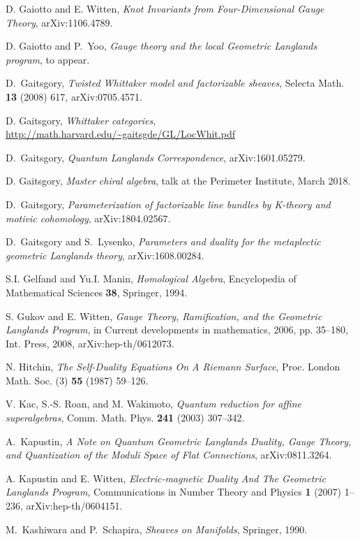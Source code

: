 \documentclass[11pt,reqno]{amsart}
\theoremstyle{plain}
\numberwithin{equation}{section}
\theoremstyle{definition}
\begin{document}
\begin{thebibliography}{AFO}
 D. Gaiotto and E. Witten, {\em Knot Invariants from
  Four-Dimensional Gauge Theory}, arXiv:1106.4789.

 D. Gaiotto and P.~Yoo, {\em Gauge theory and the local
  Geometric Langlands program}, to appear.

 D.~Gaitsgory, {\em Twisted Whittaker model and
  factorizable sheaves}, Selecta Math. {\bf 13} (2008) 617,
  arXiv:0705.4571.

 D. Gaitsgory, {\em Whittaker categories},
\url{http://math.harvard.edu/~gaitsgde/GL/LocWhit.pdf}

 D.~Gaitsgory, {\em Quantum Langlands Correspondence},
  arXiv:1601.05279.

 D. Gaitsgory, {\em Master chiral algebra}, talk at
the Perimeter Institute, March 2018.

 D.~Gaitsgory, {\em Parameterization of factorizable line
  bundles by K-theory and motivic cohomology}, arXiv:1804.02567.

 D.~Gaitsgory and S.~Lysenko, {\em Parameters and duality for
    the metaplectic geometric Langlands theory}, arXiv:1608.00284.

 S.I. Gelfand and Yu.I. Manin, {\em Homological Algebra},
Encyclopedia of Mathematical Sciences {\bf 38}, Springer, 1994.

 S. Gukov and E. Witten, {\em Gauge Theory, Ramification, and
  the Geometric Langlands Program}, in Current developments in
mathematics, 2006, pp. 35--180, Int. Press, 2008,
arXiv:hep-th/0612073.

 N. Hitchin, {\em The Self-Duality Equations On A Riemann
Surface}, Proc. London Math. Soc. (3) {\bf 55} (1987) 59--126.

 V. Kac, S.-S. Roan, and M. Wakimoto, {\em Quantum reduction
  for affine superalgebras}, Comm. Math. Phys. {\bf 241} (2003)
307--342.

 A.~Kapustin, {\em A Note on Quantum Geometric Langlands
  Duality, Gauge Theory, and Quantization of the Moduli Space of Flat
  Connections}, arXiv:0811.3264.

 A. Kapustin and E. Witten, {\em Electric-magnetic Duality
  And The Geometric Langlands Program}, Communications in Number
  Theory and Physics {\bf 1} (2007) 1--236, arXiv:hep-th/0604151.

 M.~Kashiwara and P.~Schapira, {\em Sheaves on Manifolds},
Springer, 1990.


\end{thebibliography}
\end{document}
